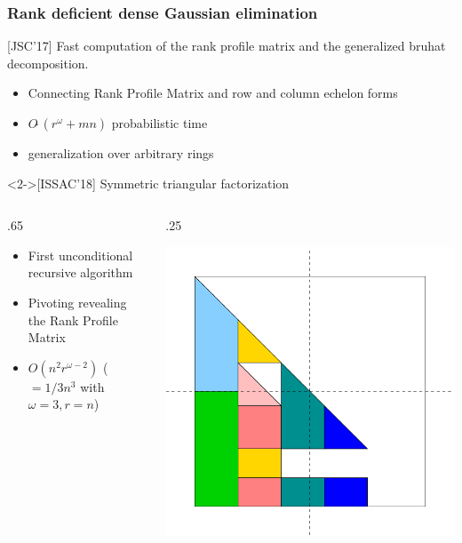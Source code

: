 \documentclass{beamer}
\begin{document}
\begin{frame}
  \frametitle{Rank deficient dense Gaussian elimination}
  \begin{block}
    {[JSC'17] Fast computation of the rank profile matrix and the generalized
      bruhat decomposition.}
{    \small
  \begin{itemize}
    \item Connecting Rank Profile Matrix and row and column echelon forms
    \item $O\tilde\ (r^\omega + mn)$ probabilistic time
    \item generalization over arbitrary rings
    \end{itemize}
}
  \end{block}

  \begin{block}<2->{[ISSAC'18] Symmetric triangular factorization}
    \begin{columns}
      \begin{column} {.65\textwidth}
        \begin{itemize}
        \item First unconditional recursive algorithm
        \item Pivoting revealing the Rank Profile Matrix
        \item $O(n^2r^{\omega-2}) $ ($=1/3n^3$ with $\omega=3, r=n$)
        \end{itemize}
      \end{column}
      \begin{column} {.25\textwidth}
        \begin{center}
          \includegraphics[width=\textwidth]{ARrec11}
        \end{center}
      \end{column}
    \end{columns}
  \end{block}
\end{frame}
\end{document}
